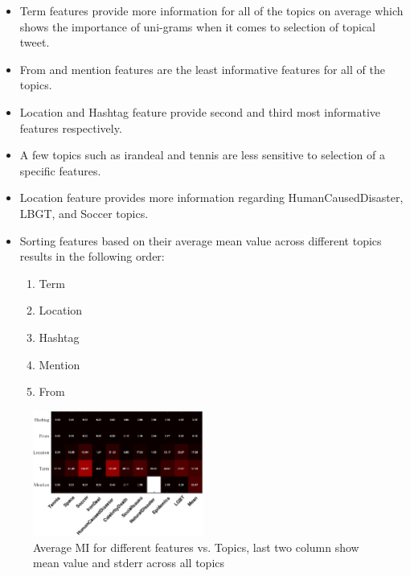 \begin{itemize}
\item Term features provide more information for all of the topics on average which shows the importance of uni-grams when it comes to selection of topical tweet.
\item From and mention features are the least informative features for all of the topics.
\item Location and Hashtag feature provide second and third most informative features respectively.
\item A few topics such as irandeal and tennis are less sensitive to selection of a specific features.
\item Location feature provides more information regarding HumanCausedDisaster, LBGT, and Soccer topics.
\item Sorting features based on their average mean value across different topics results in the following order:
\begin{enumerate}
\item Term
\item Location
\item Hashtag
\item Mention
\item From
\end{enumerate}
\end{itemize}

\iffalse
\begin{figure}[tbph!]
\centering
\includegraphics[width=0.5\textwidth]{images/avgMI.pdf}
\vspace{-3mm}
\caption{Average MI for different features vs. Topics, last two column show mean value and stderr across all topics}
\label{fig:table1}
\end{figure}

